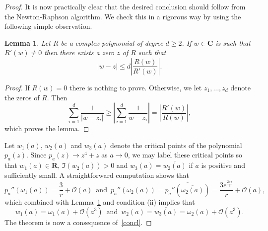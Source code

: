 \documentclass[10pt,twoside,a4paper,reqno]{amsart}
\theoremstyle{plain}
\newtheorem{lemm+}           {Lemma}        [section]
\theoremstyle{definition}
\newenvironment{lemma}{\begin{lemm+}}{\end{lemm+}}
\begin{document}
{\begin{proof}
It is now practically clear that the desired conclusion should follow from 
the Newton-Raphson algorithm. We check this in a rigorous way by using 
the following simple observation.

\begin{lemma}\label{NR}
Let $R$ be a complex polynomial of degree $d\ge 2$. If $w\in \mathbf{C}$ is 
such that $R'(w)\neq 0$ then there exists a zero $z$ of $R$ such that
$$|w-z|\le d\left|\frac{R(w)}{R'(w)}\right|.$$
\end{lemma}

\begin{proof}
If $R(w)=0$ there is nothing to prove. Otherwise, we let 
$z_1,\ldots,z_d$ denote the zeros of $R$. Then
$$\sum_{i=1}^{d}\frac{1}{|w-z_i|}\ge \left|\sum_{i=1}^{d}\frac{1}{w-z_i}\right|
=\left|\frac{R'(w)}{R(w)}\right|,$$
which proves the lemma.
\end{proof}

Let $w_1(a)$, $w_2(a)$ and $w_3(a)$ denote the critical points of the 
polynomial $p_a(z)$. Since $p_a(z)\rightarrow z^4+z$ as $a\rightarrow 0$, 
we may label these critical points so that $w_1(a)\in \mathbf{R}$, 
$\Im (w_2(a))>0$ and $w_3(a)=\overline{w_2(a)}$ if $a$ is positive and 
sufficiently small. A straightforward computation shows that
\begin{equation*}
p_{a}''(\omega_1(a))=\frac{3}{r}+\mathcal{O}(a)\,\text{ and }\,
p_{a}''(\omega_2(a))=\overline{p_{a}''\left(\overline{\omega_2(a)}\right)}
=\frac{3e^{\frac{2\pi i}{3}}}{r}+\mathcal{O}(a),
\end{equation*}
which combined with Lemma~\ref{NR} and condition (ii) implies that
$$w_1(a)=\omega_1(a)+\mathcal{O}(a^3)\,\text{ and }\,w_2(a)=\overline{w_3(a)}
=\omega_2(a)+\mathcal{O}(a^3).$$
The theorem is now a consequence of~\eqref{concl}. 
\end{proof}

}
\end{document}
